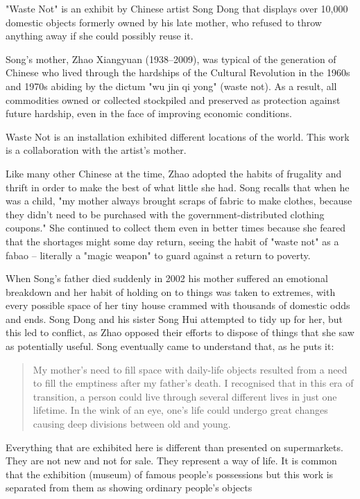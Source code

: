 "Waste Not" is an exhibit by Chinese artist Song Dong that displays over 10,000 domestic objects formerly owned by his late mother, who refused to throw anything away if she could possibly reuse it. 

Song’s mother, Zhao Xiangyuan (1938–2009), was typical of the generation of Chinese who lived through the hardships of the Cultural Revolution in the 1960s and 1970s abiding by the dictum "wu jin qi yong" (waste not). As a result, all commodities owned or collected stockpiled and preserved as protection against future hardship, even in the face of improving economic conditions.

Waste Not is an installation exhibited different locations of the world. This work is a collaboration with the artist’s mother.

Like many other Chinese at the time, Zhao adopted the habits of frugality and thrift in order to make the best of what little she had. Song recalls that when he was a child, "my mother always brought scraps of fabric to make clothes, because they didn't need to be purchased with the government-distributed clothing coupons." She continued to collect them even in better times because she feared that the shortages might some day return, seeing the habit of "waste not" as a fabao – literally a "magic weapon" to guard against a return to poverty.

When Song's father died suddenly in 2002 his mother suffered an emotional breakdown and her habit of holding on to things was taken to extremes, with every possible space of her tiny house crammed with thousands of domestic odds and ends. Song Dong and his sister Song Hui attempted to tidy up for her, but this led to conflict, as Zhao opposed their efforts to dispose of things that she saw as potentially useful. Song eventually came to understand that, as he puts it:

\begin{singlespace}
\begin{quote}
My mother's need to fill space with daily-life objects resulted from a need to fill the emptiness after my father's death. I recognised that in this era of transition, a person could live through several different lives in just one lifetime. In the wink of an eye, one's life could undergo great changes causing deep divisions between old and young.
\end{quote}
\end{singlespace}

Everything that are exhibited here is different than presented on supermarkets. They are not new and not for sale. They represent a way of life. It is common that the exhibition (museum) of famous people's possessions but this work is separated from them as showing ordinary people's objects

